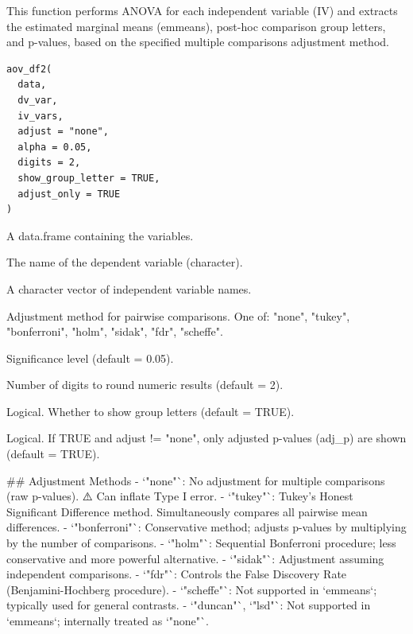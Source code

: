 \documentclass[a4paper]{book}
\begin{document}
%
\begin{Description}
This function performs ANOVA for each independent variable (IV) and extracts
the estimated marginal means (emmeans), post-hoc comparison group letters, and
p-values, based on the specified multiple comparisons adjustment method.
\end{Description}
%
\begin{Usage}
\begin{verbatim}
aov_df2(
  data,
  dv_var,
  iv_vars,
  adjust = "none",
  alpha = 0.05,
  digits = 2,
  show_group_letter = TRUE,
  adjust_only = TRUE
)
\end{verbatim}
\end{Usage}
%
\begin{Arguments}
\begin{ldescription}
\item[\code{data}] A data.frame containing the variables.

\item[\code{dv\_var}] The name of the dependent variable (character).

\item[\code{iv\_vars}] A character vector of independent variable names.

\item[\code{adjust}] Adjustment method for pairwise comparisons. One of:
"none", "tukey", "bonferroni", "holm", "sidak", "fdr", "scheffe".

\item[\code{alpha}] Significance level (default = 0.05).

\item[\code{digits}] Number of digits to round numeric results (default = 2).

\item[\code{show\_group\_letter}] Logical. Whether to show group letters (default = TRUE).

\item[\code{adjust\_only}] Logical. If TRUE and adjust != "none", only adjusted p-values (adj\_p) are shown (default = TRUE).
\end{ldescription}
\end{Arguments}
%
\begin{Details}
\#\# Adjustment Methods
- `"none"`: No adjustment for multiple comparisons (raw p-values). ⚠️ Can inflate Type I error.
- `"tukey"`: Tukey's Honest Significant Difference method. Simultaneously compares all pairwise mean differences.
- `"bonferroni"`: Conservative method; adjusts p-values by multiplying by the number of comparisons.
- `"holm"`: Sequential Bonferroni procedure; less conservative and more powerful alternative.
- `"sidak"`: Adjustment assuming independent comparisons.
- `"fdr"`: Controls the False Discovery Rate (Benjamini-Hochberg procedure).
- `"scheffe"`: Not supported in `emmeans`; typically used for general contrasts.
- `"duncan"`, `"lsd"`: Not supported in `emmeans`; internally treated as `"none"`.
\end{Details}
\end{document}
